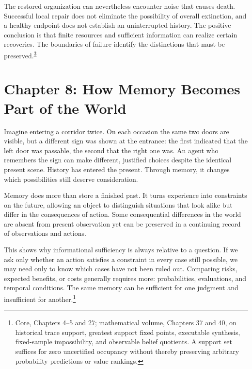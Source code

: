 \documentclass[
  english,
  11pt,
  oneside]{book}
\begin{document}
\begingroup{}

The restored organization can nevertheless encounter noise that causes death. Successful local repair does not eliminate the possibility of overall extinction, and a healthy endpoint does not establish an uninterrupted history. The positive conclusion is that finite resources and sufficient information can realize certain recoveries. The boundaries of failure identify the distinctions that must be preserved.\textsuperscript{\hyperlink{ph-note-3}{3}}

\par\endgroup

\chapter{Chapter 8: How Memory Becomes Part of the World}\label{ph-ch-08}

Imagine entering a corridor twice. On each occasion the same two doors are visible, but a different sign was shown at the entrance: the first indicated that the left door was passable, the second that the right one was. An agent who remembers the sign can make different, justified choices despite the identical present scene. History has entered the present. Through memory, it changes which possibilities still deserve consideration.

Memory does more than store a finished past. It turns experience into constraints on the future, allowing an object to distinguish situations that look alike but differ in the consequences of action. Some consequential differences in the world are absent from present observation yet can be preserved in a continuing record of observations and actions.

This shows why informational sufficiency is always relative to a question. If we ask only whether an action satisfies a constraint in every case still possible, we may need only to know which cases have not been ruled out. Comparing risks, expected benefits, or costs generally requires more: probabilities, evaluations, and temporal conditions. The same memory can be sufficient for one judgment and insufficient for another.\footnote{\hypertarget{ph-note-20}{}Core, Chapters 4--5 and 27; mathematical volume, Chapters 37 and 40, on historical trace support, greatest support fixed points, executable synthesis, fixed-sample impossibility, and observable belief quotients. A support set suffices for zero uncertified occupancy without thereby preserving arbitrary probability predictions or value rankings.}
\end{document}
